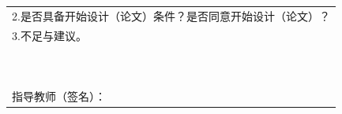 \documentclass[supercite]{Experimental_Report}
\theoremstyle{definition}
\begin{document}
\begin{table}[htbp]
{{\begin{tabular}{|cccccc|}
\multicolumn{6}{|l|}{{2.是否具备开始设计（论文）条件？是否同意开始设计（论文）？ }}   \\
\multicolumn{6}{|l|}{{3.不足与建议。}}  \\
\hline
\multicolumn{6}{|c|}{{\color[HTML]{FF0000} }}                                                                                                                                           \\
\multicolumn{6}{|c|}{{\color[HTML]{FF0000} }}                                                                                                                                           \\
\multicolumn{6}{|c|}{{\color[HTML]{FF0000} }}                                                                                                                                           \\
\multicolumn{6}{|c|}{{\color[HTML]{FF0000} }}                                                                                                                                           \\
\multicolumn{6}{|c|}{{\color[HTML]{FF0000} }}                                                                                                                                           \\
\multicolumn{6}{|c|}{{\color[HTML]{FF0000} }}                                                                                                                                                                                                                    \\
\multicolumn{6}{|c|}{{\color[HTML]{FF0000} }}                                                                                                                                           \\
\multicolumn{6}{|c|}{{\color[HTML]{FF0000} }}                                                                                                                                           \\
\multicolumn{6}{|c|}{\multirow{-15}{*}{{\color[HTML]{FF0000} }}}                                                                                                                        \\ \hline
\multicolumn{6}{|l|}{}                                                                                                                                                                  \\
\multicolumn{6}{|l|}{\multirow{-2}{*}{\qquad \qquad \qquad \qquad \qquad \qquad \qquad \qquad 指导教师（签名）：}}                                                                                                                                       \\ 

\end{tabular}}}
\end{table}
\end{document}
